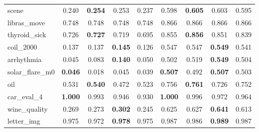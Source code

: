 \begin{figure}[ht]
\begin{tabular}{p{22mm}|*4{p{14mm}}|*4{p{14mm}}}
        scene&\multicolumn{1}{c}{0.240}&\multicolumn{1}{c}{\textbf{0.254}}&\multicolumn{1}{c}{0.253}&\multicolumn{1}{c|}{0.237}&\multicolumn{1}{c}{0.598}&\multicolumn{1}{c}{\textbf{0.605}}&\multicolumn{1}{c}{0.603}&\multicolumn{1}{c}{0.595}\\
        libras\_move&\multicolumn{1}{c}{0.748}&\multicolumn{1}{c}{0.748}&\multicolumn{1}{c}{0.748}&\multicolumn{1}{c|}{0.748}&\multicolumn{1}{c}{0.866}&\multicolumn{1}{c}{0.866}&\multicolumn{1}{c}{0.866}&\multicolumn{1}{c}{0.866}\\
        thyroid\_sick&\multicolumn{1}{c}{0.726}&\multicolumn{1}{c}{\textbf{0.727}}&\multicolumn{1}{c}{0.719}&\multicolumn{1}{c|}{0.695}&\multicolumn{1}{c}{0.855}&\multicolumn{1}{c}{\textbf{0.856}}&\multicolumn{1}{c}{0.851}&\multicolumn{1}{c}{0.839}\\
        coil\_2000&\multicolumn{1}{c}{0.137}&\multicolumn{1}{c}{0.137}&\multicolumn{1}{c}{\textbf{0.145}}&\multicolumn{1}{c|}{0.126}&\multicolumn{1}{c}{0.547}&\multicolumn{1}{c}{0.547}&\multicolumn{1}{c}{\textbf{0.549}}&\multicolumn{1}{c}{0.541}\\
        arrhythmia&\multicolumn{1}{c}{0.045}&\multicolumn{1}{c}{0.083}&\multicolumn{1}{c}{\textbf{0.140}}&\multicolumn{1}{c|}{0.050}&\multicolumn{1}{c}{0.502}&\multicolumn{1}{c}{0.519}&\multicolumn{1}{c}{\textbf{0.549}}&\multicolumn{1}{c}{0.504}\\
        solar\_flare\_m0&\multicolumn{1}{c}{\textbf{0.046}}&\multicolumn{1}{c}{0.018}&\multicolumn{1}{c}{0.045}&\multicolumn{1}{c|}{0.039}&\multicolumn{1}{c}{\textbf{0.507}}&\multicolumn{1}{c}{0.492}&\multicolumn{1}{c}{\textbf{0.507}}&\multicolumn{1}{c}{0.503}\\
        oil&\multicolumn{1}{c}{0.531}&\multicolumn{1}{c}{\textbf{0.540}}&\multicolumn{1}{c}{0.472}&\multicolumn{1}{c|}{0.523}&\multicolumn{1}{c}{0.756}&\multicolumn{1}{c}{\textbf{0.761}}&\multicolumn{1}{c}{0.726}&\multicolumn{1}{c}{0.752}\\
        car\_eval\_4&\multicolumn{1}{c}{\textbf{1.000}}&\multicolumn{1}{c}{0.993}&\multicolumn{1}{c}{0.946}&\multicolumn{1}{c|}{0.930}&\multicolumn{1}{c}{\textbf{1.000}}&\multicolumn{1}{c}{0.996}&\multicolumn{1}{c}{0.972}&\multicolumn{1}{c}{0.964}\\
        wine\_quality&\multicolumn{1}{c}{0.269}&\multicolumn{1}{c}{0.273}&\multicolumn{1}{c}{\textbf{0.302}}&\multicolumn{1}{c|}{0.245}&\multicolumn{1}{c}{0.625}&\multicolumn{1}{c}{0.627}&\multicolumn{1}{c}{\textbf{0.641}}&\multicolumn{1}{c}{0.613}\\
        letter\_img&\multicolumn{1}{c}{0.975}&\multicolumn{1}{c}{0.972}&\multicolumn{1}{c}{\textbf{0.978}}&\multicolumn{1}{c|}{0.975}&\multicolumn{1}{c}{0.987}&\multicolumn{1}{c}{0.986}&\multicolumn{1}{c}{\textbf{0.989}}&\multicolumn{1}{c}{0.987}\\

\end{tabular}
\end{figure}

